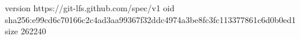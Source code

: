 version https://git-lfs.github.com/spec/v1
oid sha256:e99cd6c70166c2c4ad3aa99367f32ddc4974a3be8fc3fc113377861c6d0b0ed1
size 262240
